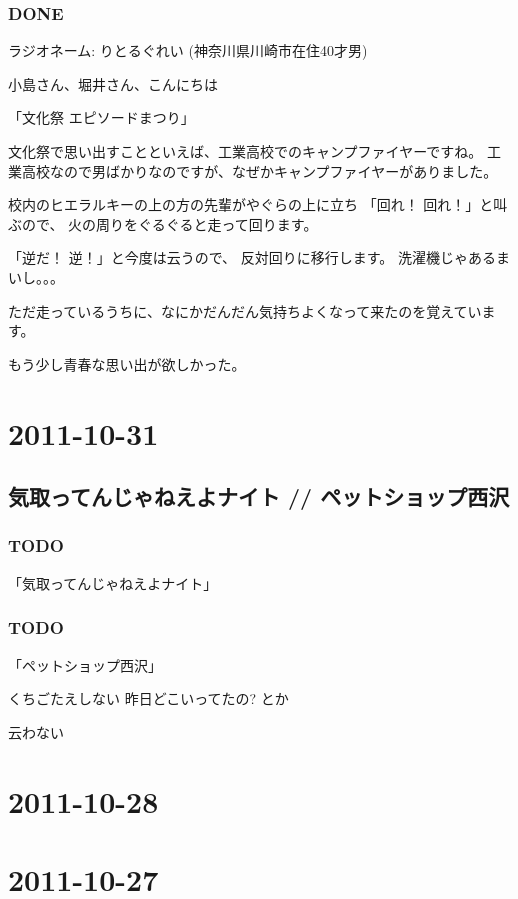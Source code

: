 \documentclass[11pt]{article}
\begin{document}
\subsubsection{\textbf{DONE}}
\label{sec-46_2_1}

ラジオネーム: りとるぐれい (神奈川県川崎市在住40才男)

小島さん、堀井さん、こんにちは

「文化祭 エピソードまつり」

文化祭で思い出すことといえば、工業高校でのキャンプファイヤーですね。
工業高校なので男ばかりなのですが、なぜかキャンプファイヤーがありました。

校内のヒエラルキーの上の方の先輩がやぐらの上に立ち
「回れ！ 回れ！」と叫ぶので、
火の周りをぐるぐると走って回ります。

「逆だ！ 逆！」と今度は云うので、
反対回りに移行します。
洗濯機じゃあるまいし。。。

ただ走っているうちに、なにかだんだん気持ちよくなって来たのを覚えています。

もう少し青春な思い出が欲しかった。
\section{2011-10-31}
\label{sec-47}
\subsection{気取ってんじゃねえよナイト // ペットショップ西沢}
\label{sec-47_1}
\subsubsection{\textbf{TODO}}
\label{sec-47_1_1}

「気取ってんじゃねえよナイト」
\subsubsection{\textbf{TODO}}
\label{sec-47_1_2}

「ペットショップ西沢」

くちごたえしない
昨日どこいってたの? とか

云わない
\section{2011-10-28}
\label{sec-48}
\subsection{}
\section{2011-10-27}
\label{sec-49}
\end{document}
